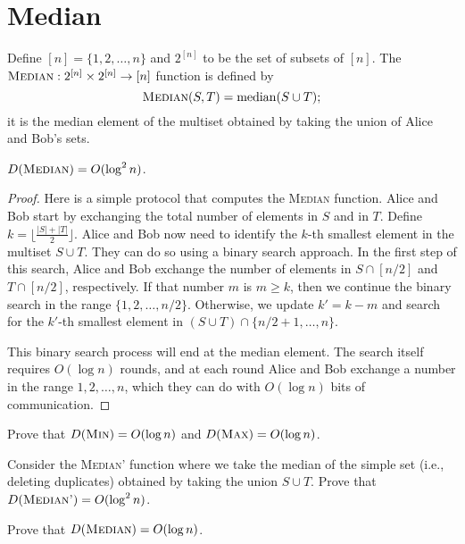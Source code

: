 \newpage \section{Median}
Define $[n] = \{1,2,\ldots,n\}$ and $2^{[n]}$ to be the set of subsets of $[n]$. The $\textsc{Median} : 2^{[n]} \times 2^{[n]} \to [n]$ function is defined by
\[
\textsc{Median}(S,T) = \mathrm{median}(S \cup T);
\]
it is the median element of the multiset obtained by taking the union of Alice and Bob's sets. 

\begin{theorem}
$D(\textsc{Median}) = O(\log^2 n)$.
\end{theorem}

\begin{proof}
Here is a simple protocol that computes the \textsc{Median} function. Alice and Bob start by exchanging the total number of elements in $S$ and in $T$. Define $k = \lfloor \frac{|S| + |T|}2 \rfloor$. Alice and Bob now need to identify the $k$-th smallest element in the multiset $S \cup T$. They can do so using a binary search approach. In the first step of this search, Alice and Bob exchange the number of elements in $S \cap [n/2]$ and $T \cap [n/2]$, respectively. If that number $m$ is $m \ge k$, then we continue the binary search in the range $\{1,2,\ldots,n/2\}$. Otherwise, we update $k' = k - m$ and search for the $k'$-th smallest element in $(S \cup T) \cap \{n/2+1,\ldots,n\}$.

This binary search process will end at the median element. The search itself requires $O( \log n)$ rounds, and at each round Alice and Bob exchange a number in the range $1,2,\ldots,n$, which they can do with $O(\log n)$ bits of communication.
\end{proof}

\exercises

\begin{exercise} %
Prove that $D(\textsc{Min}) = O(\log n)$ and $D(\textsc{Max}) = O(\log n)$.
\end{exercise}

\begin{exercise}
Consider the \textsc{Median'} function where we take the median of the simple set (i.e., deleting duplicates) obtained by taking the union $S \cup T$. 
Prove that $D(\textsc{Median'}) = O(\log^2 n)$.
\end{exercise}

\begin{exercise} %
Prove that $D(\textsc{Median}) = O(\log n)$.
\end{exercise}


